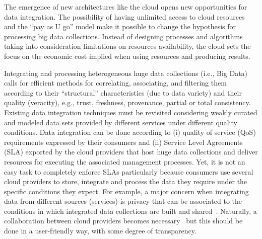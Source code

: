 The emergence of new architectures like the cloud opens new opportunities for data integration. 
The possibility of having unlimited access to cloud resources and the ``pay as U go'' model make it possible to change the hypothesis for processing big  data collections.  Instead of designing processes and algorithms taking into consideration  limitations on resources availability, the cloud sets the focus on the economic cost implied when using resources and producing results.
 
Integrating and processing heterogeneous huge data collections (i.e., Big Data) calls for efficient methods for correlating, associating, and filtering them according to their ``structural'' characteristics (due to data variety) and their quality (veracity), e.g., trust, freshness, provenance, partial or total consistency. 
Existing data integration techniques must be revisited considering weakly curated and modeled data sets provided by different services under different quality conditions. Data integration can be done according to  (i) quality of service (QoS) requirements expressed by their consumers and (ii) Service Level Agreements (SLA)  exported by the cloud providers that host  huge data collections and deliver resources for executing the associated management processes. 
Yet, it is not an easy task to completely enforce SLAs particularly because
consumers use several cloud providers to store, integrate and process the data
they require under the specific conditions they expect. For example, a major concern when
integrating data from different sources (services) is privacy that can be
associated to the conditions in which integrated data collections are built and
shared~\cite{YauY08}.     
Naturally, a collaboration between cloud providers becomes necessary~\cite{036}
but this should be  done in a user-friendly way, with some degree of
transparency. 

